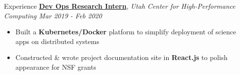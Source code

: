 \documentclass{resume/resume}
\begin{document}
\begin{rSection}{Experience}
    \href{https://slateci.io/}{\bf Dev Ops Research Intern}, {\em Utah Center for High-Performance Computing \hfill Mar 2019 - Feb 2020}
    \vspace{-6pt}
    \begin{itemize}[nosep]
        \item Built a {\bf Kubernetes/Docker} platform to simplify deployment of science apps on distributed systems
        \item Constructed \& wrote project documentation site in {\bf React.js} to polish appearance for NSF grants
    \end{itemize}
    
    


\end{rSection}
\end{document}
